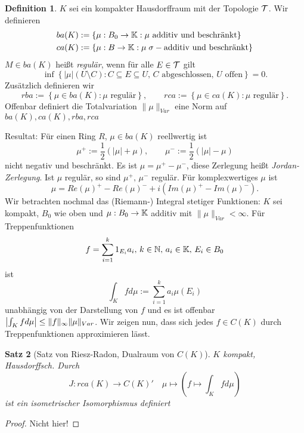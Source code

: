 \documentclass[ngerman]{report}
\theoremstyle{plain}%
\newtheorem{thm}{Satz}[chapter]
\theoremstyle{definition}%
\newtheorem{definition}[thm]{Definition}
\theoremstyle{myStyle}
\begin{document}
	\begin{definition}
	$K$ sei ein kompakter Hausdorffraum mit der Topologie $\mathcal{T}$. Wir definieren
	\begin{equation*}
		\begin{split}
		& ba(K) := \{\mu : B_0 \to \mathbb{K} : \mu \text{ additiv und beschränkt} \}\\
		& ca(K) := \{\mu : B \to \mathbb{K} : \mu\; \sigma-\text{additiv und beschränkt} \}
		\end{split}
	\end{equation*}
		$M\in ba(K)$ heißt \textit{regulär}, wenn für alle $E\in \mathcal{T}$ gilt
		$$\inf \left\lbrace |\mu| (U\setminus C) : C\subseteq E \subseteq U,\, C \text{ abgeschlossen, } U \text{ offen} \right\rbrace = 0.$$
		Zusätzlich definieren wir
		$$rba := \left\lbrace \mu \in ba(K) : \mu \text{ regulär}\right\rbrace,\qquad 
		rca := \left\lbrace \mu \in ca(K) : \mu \text{ regulär}\right\rbrace. $$
		Offenbar definiert die Totalvariation $\|\mu \|_{Var}$ eine Norm auf $ba(K), ca(K), rba, rca$
	\end{definition}	
	
	Resultat: Für einen Ring $R$, $\mu \in ba(K)$ reellwertig ist 
	$$\mu^+:=\frac{1}{2}(|\mu| + \mu),\qquad \mu^-:=\frac{1}{2}(|\mu| - \mu)$$
	nicht negativ und beschränkt.
	Es ist $\mu = \mu^+ - \mu^-$, diese Zerlegung heißt \textit{Jordan-Zerlegung}.
	Ist $\mu$ regulär, so sind $\mu^+,\,\mu^-$ regulär.
	Für komplexwertiges $\mu$ ist
	$$\mu = Re(\mu)^+ - Re(\mu)^- + i(Im(\mu)^+ -Im(\mu)^-).$$
	Wir betrachten nochmal das (Riemann-) Integral stetiger Funktionen:
	$K$ sei kompakt, $B_0$ wie oben und $\mu : B_0 \to \mathbb{K}$ additiv mit $\|\mu \|_{Var} < \infty$. Für Treppenfunktionen 
	$$f = \sum^k_{i=1} 1_{E_i} a_i,\, k\in\mathbb{N},\,a_i\in\mathbb{K},\,E_i\in B_0$$ 
	ist 
	$$\int_K f d\mu := \sum^k_{i=1} a_i \mu(E_i)$$
	unabhängig von der Darstellung von $f$ und es ist offenbar $\left\lvert \int_K fd\mu \right\rvert \leq \|f\|_\infty \|\mu \|_{Var}$. 
	Wir zeigen nun, dass sich jedes $f \in C(K)$ durch Treppenfunktionen approximieren lässt.
	
	\begin{thm}[Satz von Riesz-Radon, Dualraum von $C(K)$]
		$K$ kompakt, Hausdorffsch. Durch
			$$ J: rca(K) \to C(K)' \quad \mu \mapsto (f\mapsto \int_K f d\mu)$$
		ist ein isometrischer Isomorphismus definiert
	\end{thm}
	
	\begin{proof}
		Nicht hier!
	\end{proof}
\end{document}
